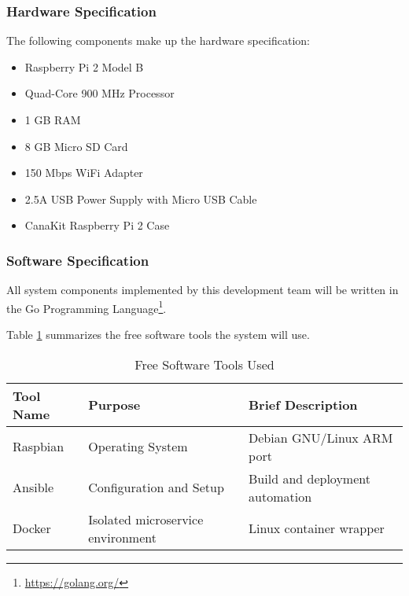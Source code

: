 \subsubsection{Hardware Specification}

The following components make up the hardware specification:

\begin{itemize}
    \item Raspberry Pi 2 Model B
    \item Quad-Core 900 MHz Processor
    \item 1 GB RAM
    \item 8 GB Micro SD Card
    \item 150 Mbps WiFi Adapter
    \item 2.5A USB Power Supply with Micro USB Cable
    \item CanaKit Raspberry Pi 2 Case
\end{itemize}

\subsubsection{Software Specification}

All system components implemented by this development team will be written
in the Go Programming Language\footnote{\url{https://golang.org/}}.

Table \ref{table:tools} summarizes the free software tools the system will use.

\begin{table}[h]
\centering
\begin{tabular}{l l l}
Tool Name & Purpose & Brief Description \\
\hline
Raspbian\tablefootnote{\url{https://www.raspbian.org/}} & Operating System & Debian GNU/Linux ARM port \\
Ansible\tablefootnote{\url{http://www.ansible.com/}} & Configuration and Setup & Build and deployment automation \\
Docker\tablefootnote{\url{https://www.docker.com/}} & Isolated microservice environment & Linux container wrapper \\
\end{tabular}
\caption{Free Software Tools Used}
\label{table:tools}
\end{table}
